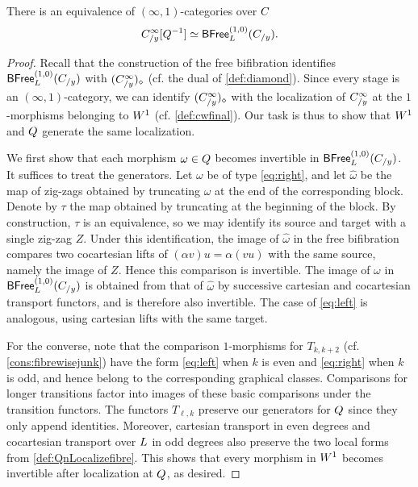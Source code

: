 \documentclass[a4paper,reqno,twoside]{amsart}
\begin{document}
\begin{lemma}\label{lem:comparisonQW}
	There is an equivalence of $(\infty,1)$-categories over $\relax{C}$
	\[
		\relax{C}_{/y}^{\infty}[\relax{Q}^{-1}]
		\simeq \mathsf{BFree}^{(1,0)}_{\relax{L}}(\relax{C}_{/y}).
	\]
\end{lemma}
\begin{proof}
	Recall that the construction of the free bifibration identifies $\mathsf{BFree}^{(1,0)}_{\relax{L}}(\relax{C}_{/y})$ with $(\relax{C}_{/y}^{\infty})_{\diamond}$ (cf. the dual of \cref{def:diamond}). Since every stage is an $(\infty,1)$-category, we can identify $(\relax{C}_{/y}^{\infty})_{\diamond}$ with the localization of $\relax{C}_{/y}^{\infty}$ at the $1$-morphisms belonging to $\relax{W}^{1}$ (cf. \cref{def:cwfinal}). Our task is thus to show that $\relax{W}^{1}$ and $\relax{Q}$ generate the same localization.
	
	We first show that each morphism $\omega\in\relax{Q}$ becomes invertible in $\mathsf{BFree}^{(1,0)}_{\relax{L}}(\relax{C}_{/y})$. It suffices to treat the generators. Let $\omega$ be of type \cref{eq:right}, and let $\widehat\omega$ be the map of zig-zags obtained by truncating $\omega$ at the end of the corresponding block. Denote by $\tau$ the map obtained by truncating at the beginning of the block. By construction, $\tau$ is an equivalence, so we may identify its source and target with a single zig-zag $Z$. Under this identification, the image of $\widehat\omega$ in the free bifibration compares two cocartesian lifts of $(\alpha v)u=\alpha(vu)$ with the same source, namely the image of $Z$. Hence this comparison is invertible. The image of $\omega$ in $\mathsf{BFree}^{(1,0)}_{\relax{L}}(\relax{C}_{/y})$ is obtained from that of $\widehat\omega$ by successive cartesian and cocartesian transport functors, and is therefore also invertible. The case of \cref{eq:left} is analogous, using cartesian lifts with the same target.

	For the converse, note that the comparison $1$-morphisms for $T_{k,k+2}$ (cf. \cref{cons:fibrewisejunk}) have the form \cref{eq:left} when $k$ is even and \cref{eq:right} when $k$ is odd, and hence belong to the corresponding graphical classes. Comparisons for longer transitions factor into images of these basic comparisons under the transition functors. The functors $T_{\ell,k}$ preserve our generators for $\relax{Q}$ since they only append identities. Moreover, cartesian transport in even degrees and cocartesian transport over $\relax{L}$ in odd degrees also preserve the two local forms from \cref{def:QnLocalizefibre}. This shows that every morphism in $\relax{W}^{1}$ becomes invertible after localization at $\relax{Q}$, as desired.
\end{proof}
\end{document}
